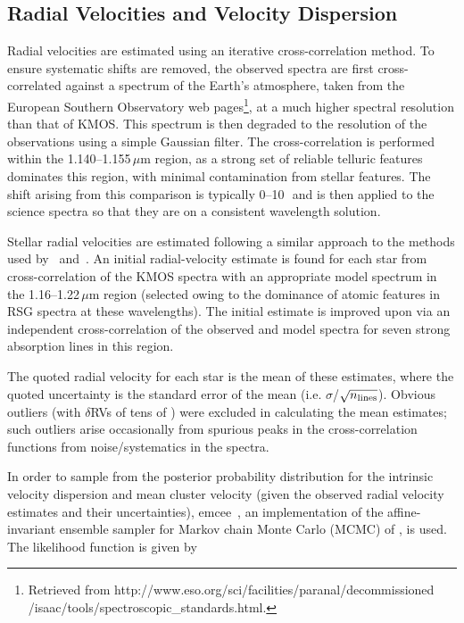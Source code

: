 \subsection{Radial Velocities and Velocity Dispersion} %
\label{sub:radial_velocities}
Radial velocities are estimated using an iterative cross-correlation method.
To ensure systematic shifts are removed, the observed spectra are first cross-correlated against a spectrum of the Earth's atmosphere, taken from the European Southern Observatory web pages\footnote{Retrieved from http://www.eso.org/sci/facilities/paranal/decommissioned\\/isaac/tools/spectroscopic\_standards.html.}, at a much higher spectral resolution than that of KMOS.
This spectrum is then degraded to the resolution of the observations using a simple Gaussian filter.
The cross-correlation is performed within the 1.140--1.155\,$\mu$m region, as a strong set of reliable telluric features dominates this region, with minimal contamination from stellar features.
The shift arising from this comparison is typically 0--10\,\kms~and is then applied to the science spectra so that they are on a consistent wavelength solution.

Stellar radial velocities are estimated following a similar approach to the methods used by~\citet{2015ApJ...798...23L} and~\citet{2015ApJ...803...14P}. An initial radial-velocity estimate is found for each star from cross-correlation of the KMOS spectra with an appropriate model spectrum in the 1.16--1.22\,$\mu$m region
(selected owing to the dominance of atomic features in RSG spectra at these wavelengths).
The initial estimate is improved upon via an independent cross-correlation of the observed and model spectra for seven strong absorption lines in this region.

The quoted radial velocity for each star is the mean of these estimates, where the quoted uncertainty is the standard error of the mean
(i.e. $\sigma$/$\sqrt{n_{\rm lines}}$).
Obvious outliers (with $\delta$RVs of tens of \kms) were excluded in calculating the mean estimates; such outliers arise occasionally from spurious peaks in the cross-correlation functions from noise/systematics in the spectra.

In order to sample from the posterior probability distribution for the intrinsic velocity dispersion and mean cluster velocity (given the observed radial velocity estimates and their uncertainties), {\sc emcee}~\citep{2013PASP..125..306F},
an implementation of the affine-invariant ensemble sampler for Markov chain Monte Carlo (MCMC) of \cite{2010CAMCS.5..65G}, is used. The likelihood function is given by

